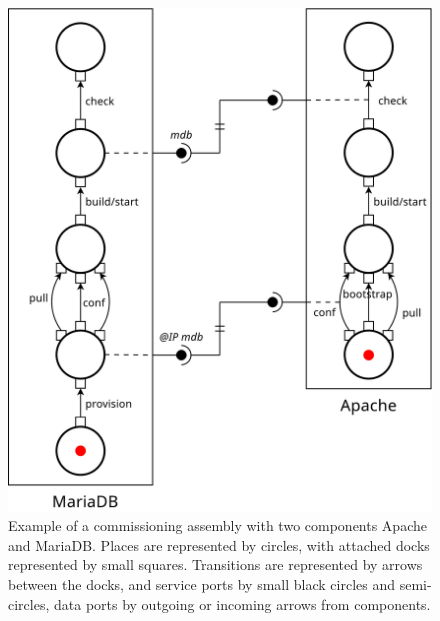 \begin{figure}[tbp]
  \begin{center}
    \includegraphics[width=0.7\linewidth]{./images/apachebdd.pdf}
  \end{center}
  \caption{Example of a \mad commissioning assembly with two components
    Apache and MariaDB. Places are represented by circles, with attached
    docks represented by small squares. Transitions are represented
    by arrows between the docks, and service ports by small black circles and
    semi-circles, data ports by outgoing or incoming arrows from
    components. }
  \label{fig:example}
\end{figure}

